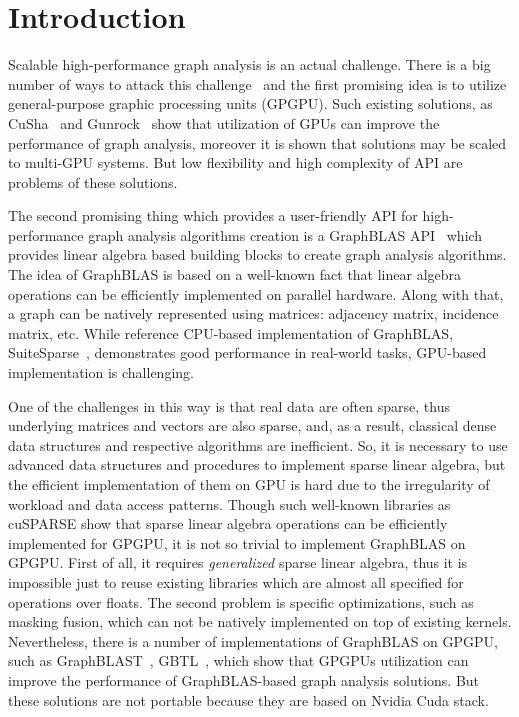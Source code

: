 \section{Introduction}

Scalable high-performance graph analysis is an actual challenge.
There is a big number of ways to attack this challenge~\cite{Coimbra2021} and the first promising idea is to utilize general-purpose graphic processing units (GPGPU).
Such existing solutions, as CuSha~\cite{10.1145/2600212.2600227} and Gunrock~\cite{7967137} show that utilization of GPUs can improve the performance of graph analysis, moreover it is shown that solutions may be scaled to multi-GPU systems.
But low flexibility and high complexity of API are problems of these solutions.

The second promising thing which provides a user-friendly API for high-performance graph analysis algorithms creation is a GraphBLAS API~\cite{7761646} which provides linear algebra based building blocks to create graph analysis algorithms.
The idea of GraphBLAS is based on a well-known fact that linear algebra operations can be efficiently implemented on parallel hardware.
Along with that, a graph can be natively represented using matrices: adjacency matrix, incidence matrix, etc.
While reference CPU-based implementation of GraphBLAS, SuiteSparse~\cite{10.1145/3322125}, demonstrates good performance in real-world tasks, GPU-based implementation is challenging.

One of the challenges in this way is that real data are often sparse, thus underlying matrices and vectors are also sparse, and, as a result, classical dense data structures and respective algorithms are inefficient. 
So, it is necessary to use advanced data structures and procedures to implement sparse linear algebra, but the efficient implementation of them on GPU is hard due to the irregularity of workload and data access patterns.
Though such well-known libraries as cuSPARSE show that sparse linear algebra operations can be efficiently implemented for GPGPU, it is not so trivial to implement GraphBLAS on GPGPU. 
First of all, it requires \textit{generalized} sparse linear algebra, thus it is impossible just to reuse existing libraries which are almost all specified for operations over floats.
The second problem is specific optimizations, such as masking fusion, which can not be natively implemented on top of existing kernels.
Nevertheless, there is a number of implementations of GraphBLAS on GPGPU, such as GraphBLAST~\cite{yang2019graphblast}, GBTL~\cite{7529957}, which show that GPGPUs utilization can improve the performance of GraphBLAS-based graph analysis solutions.
But these solutions are not portable because they are based on Nvidia Cuda stack.


